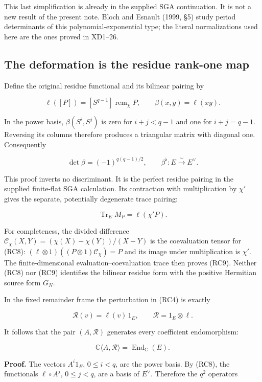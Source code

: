 This last simplification is already in the supplied SGA continuation. It is not a new result of the present note. Bloch and Esnault (1999, §5) study period determinants of this polynomial-exponential type; the literal normalizations used here are the ones proved in XD1--26.

\subsection{The deformation is the residue rank-one map}\label{endpoint-residue_original--the-deformation-is-the-residue-rank-one-map}

Define the original residue functional and its bilinear pairing by

\[
\ell([P])=[S^{q-1}]\operatorname{rem}_\chi P,
\qquad \beta(x,y)=\ell(xy).
\tag{RC7}
\]

In the power basis, \(\beta(S^i,S^j)\) is zero for \(i+j<q-1\) and one for \(i+j=q-1\). Reversing its columns therefore produces a triangular matrix with diagonal one. Consequently

\[
\det\beta=(-1)^{q(q-1)/2},\qquad
\beta^\flat:E\xrightarrow{\sim}E^\vee.
\tag{RC8}
\]

This proof inverts no discriminant. It is the perfect residue pairing in the supplied finite-flat SGA calculation. Its contraction with multiplication by \(\chi'\) gives the separate, potentially degenerate trace pairing:

\[
\operatorname{Tr}_E M_P=\ell(\chi'P).
\tag{RC9}
\]

For completeness, the divided difference \(\mathcal C_\chi(X,Y)=(\chi(X)-\chi(Y))/(X-Y)\) is the coevaluation tensor for (RC8): \((\ell\otimes1)((P\otimes1)\mathcal C_\chi)=P\) and its image under multiplication is \(\chi'\). The finite-dimensional evaluation--coevaluation trace then proves (RC9). Neither (RC8) nor (RC9) identifies the bilinear residue form with the positive Hermitian source form \(G_N\).

In the fixed remainder frame the perturbation in (RC4) is exactly

\[
\boxed{\mathcal R(v)=\ell(v)\,1_E,
\qquad \mathcal R=1_E\otimes\ell.}
\tag{RC10}
\]

It follows that the pair \((A,\mathcal R)\) generates every coefficient endomorphism:

\[
\boxed{\mathbb C\langle A,\mathcal R\rangle
=\operatorname{End}_{\mathbb C}(E).}
\tag{RC11}
\]

\textbf{Proof.} The vectors \(A^i1_E\), \(0\leq i<q\), are the power basis. By (RC8), the functionals \(\ell\circ A^j\), \(0\leq j<q\), are a basis of \(E^\vee\). Therefore the \(q^2\) operators

